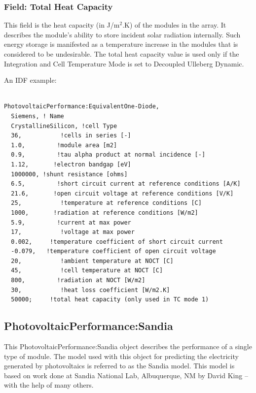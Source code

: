 \subsubsection{Field: Total Heat Capacity}\label{field-total-heat-capacity}

This field is the heat capacity (in J/m\(^{2}\).K) of the modules in the array. It describes the module's ability to store incident solar radiation internally. Such energy storage is manifested as a temperature increase in the modules that is considered to be undesirable. The total heat capacity value is used only if the Integration and Cell Temperature Mode is set to Decoupled Ulleberg Dynamic.

An IDF example:

\begin{lstlisting}

PhotovoltaicPerformance:EquivalentOne-Diode,
  Siemens, ! Name
  CrystallineSilicon, !cell Type
  36,           !cells in series [-]
  1.0,         !module area [m2]
  0.9,         !tau alpha product at normal incidence [-]
  1.12,       !electron bandgap [eV]
  1000000, !shunt resistance [ohms]
  6.5,         !short circuit current at reference conditions [A/K]
  21.6,       !open circuit voltage at reference conditions [V/K]
  25,           !temperature at reference conditions [C]
  1000,       !radiation at reference conditions [W/m2]
  5.9,         !current at max power
  17,           !voltage at max power
  0.002,     !temperature coefficient of short circuit current
  -0.079,   !temperature coefficient of open circuit voltage
  20,           !ambient temperature at NOCT [C]
  45,           !cell temperature at NOCT [C]
  800,         !radiation at NOCT [W/m2]
  30,           !heat loss coefficient [W/m2.K]
  50000;     !total heat capacity (only used in TC mode 1)
\end{lstlisting}

\subsection{PhotovoltaicPerformance:Sandia}\label{photovoltaicperformancesandia}

This PhotovoltaicPerformance:Sandia object describes the performance of a single type of module. The model used with this object for predicting the electricity generated by photovoltaics is referred to as the Sandia model. This model is based on work done at Sandia National Lab, Albuquerque, NM by David King -- with the help of many others.

